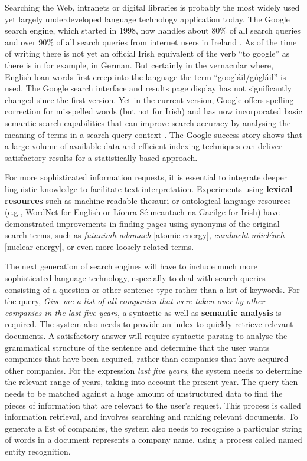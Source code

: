 \begin{multicols}{2}
Searching the Web, intranets or digital libraries is probably the most widely used yet largely underdeveloped language technology application today. The Google search engine, which started in 1998, now handles about 80\% of all search queries and over 90\% of all search queries from internet users in Ireland \cite{googlemarketshare}. As of the time of writing there is not yet an official Irish equivalent of the verb ``to google'' as there is in for example, in German. But certainly in the vernacular where, English loan words first creep into the language the term ``googláil/gúgláil'' \cite{kilgarriff2010} is used. The Google search interface and results page display has not significantly changed since the first version. Yet in the current version, Google offers spelling correction for misspelled words (but not for Irish) and has now incorporated basic semantic search capabilities that can improve search accuracy by analysing the meaning of terms in a search query context \cite{googlesemsearch}.  The Google success story shows that a large volume of available data and efficient indexing techniques can deliver satisfactory results for a statistically-based approach. 

For more sophisticated information requests, it is essential to integrate deeper linguistic knowledge to facilitate text interpretation. Experiments using \textbf{lexical resources} such as machine-readable thesauri or ontological language resources (e.g., WordNet for English or Líonra Séimeantach na Gaeilge for Irish) have demonstrated improvements in finding pages using synonyms of the original search terms, such as \textit{fuinnimh adamach} [atomic energy], \textit{cumhacht núicléach} [nuclear energy], or even more loosely related terms. 


The next generation of search engines will have to include much more sophisticated language technology, especially to deal with search queries consisting of a question or other sentence type rather than a list of keywords. For the query, \textit{Give me a list of all companies that were taken over by other companies in the last five years}, a syntactic as well as \textbf{semantic analysis} is required. The system also needs to provide an index to quickly retrieve relevant documents. A satisfactory answer will require syntactic parsing to analyse the grammatical structure of the sentence and determine that the user wants companies that have been acquired, rather than companies that have acquired other companies. For the expression \textit{last five years}, the system needs to determine the relevant range of years, taking into account the present year. The query then needs to be matched against a huge amount of unstructured data to find the pieces of information that are relevant to the user's request. This process is called information retrieval, and involves searching and ranking relevant documents. To generate a list of companies, the system also needs to recognise a particular string of words in a document represents a company name, using a process called named entity recognition.


\end{multicols}
